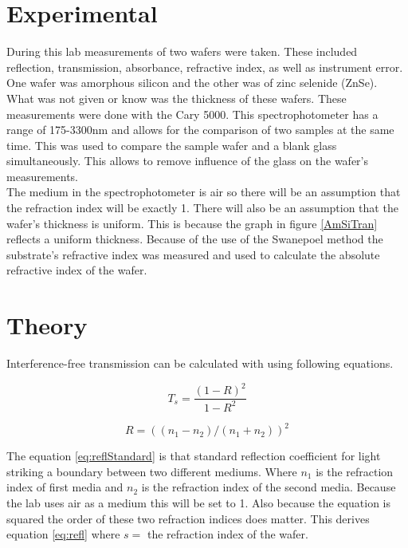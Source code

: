 \documentclass[10pt,a4paper]{article}
\begin{document}
\begin{multicols}{2}
\section*{Experimental}
During this lab measurements of two wafers were taken. These included reflection, transmission, absorbance, refractive index, as well as instrument error. One wafer was amorphous silicon and the other was of zinc selenide (ZnSe). What was not given or know was the thickness of these wafers. These measurements were done with the Cary 5000. This spectrophotometer has a range of 175-3300nm \cite{carry} and allows for the comparison of two samples at the same time. This was used to compare the sample wafer and a blank glass simultaneously. This allows to remove influence of the glass on the wafer's measurements.\\
The medium in the spectrophotometer is air so there will be an assumption that the refraction index will be exactly 1. There will also be an assumption that the wafer's thickness is uniform. This is because the graph in figure \ref{AmSiTran} reflects a uniform thickness\cite{paper}. Because of the use of the Swanepoel method the substrate's refractive index was measured and used to calculate the absolute refractive index of the wafer. 





	

\section*{Theory}

Interference-free transmission can be calculated with using following equations.

\begin{equation}
\label{eq:trans}
T_s = \dfrac{(1-R)^2}{1-R^2}
\end{equation}

\begin{equation}
\label{eq:reflStandard}
R = ((n_1-n_2)/(n_1+n_2))^2
\end{equation}

The equation \ref{eq:reflStandard} is that standard reflection coefficient for light striking a boundary between two different mediums. Where $n_1$ is the refraction index of first media and $n_2$ is the refraction index of the second media. Because the lab uses air as a medium this will be set to 1. Also because the equation is squared the order of these two refraction indices does matter. This derives equation \ref{eq:refl} where $s =$ the refraction index of the wafer.


\end{multicols}
\end{document}
